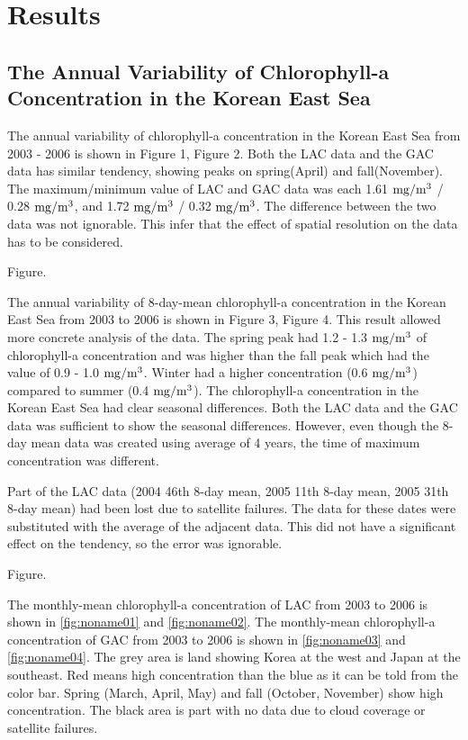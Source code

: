 
\section{Results}
 
\subsection{The Annual Variability of Chlorophyll-a Concentration in the Korean East Sea}
 
The annual variability of chlorophyll-a concentration in the Korean East Sea from 2003 - 2006 is shown in Figure 1, Figure 2. Both the LAC data and the GAC data has similar tendency, showing peaks on spring(April) and fall(November). The maximum/minimum value of LAC and GAC data was each 1.61 $\rm mg/m^3$ / 0.28 $\rm mg/m^3$, and 1.72 $\rm mg/m^3$ / 0.32 $\rm mg/m^3$. The difference between the two data was not ignorable. This infer that the effect of spatial resolution on the data has to be considered.
  
 Figure.
 
The annual variability of 8-day-mean chlorophyll-a concentration in the Korean East Sea from 2003 to 2006 is shown in Figure 3, Figure 4. This result allowed more concrete analysis of the data. The spring peak had 1.2 - 1.3 $\rm mg/m^3$ of chlorophyll-a concentration and was higher than the fall peak which had the value of 0.9 - 1.0 $\rm mg/m^3$. Winter had a higher concentration (0.6 $\rm mg/m^3$) compared to summer (0.4 $\rm mg/m^3$). The chlorophyll-a concentration in the Korean East Sea had clear seasonal differences. Both the LAC data and the GAC data was sufficient to show the seasonal differences. However, even though the 8-day mean data was created using average of 4 years, the time of maximum concentration was different. 

Part of the LAC data (2004 46th 8-day mean, 2005 11th 8-day mean, 2005 31th 8-day mean) had been lost due to satellite failures. The data for these dates were substituted with the average of the adjacent data. This did not have a significant effect on the tendency, so the error was ignorable.
  
  Figure.
 
The monthly-mean chlorophyll-a concentration of LAC from 2003 to 2006 is shown in \ref{fig:noname01} and \ref{fig:noname02}. The monthly-mean chlorophyll-a concentration of GAC from 2003 to 2006 is shown in \ref{fig:noname03} and \ref{fig:noname04}. The grey area is land showing Korea at the west and Japan at the southeast. Red means high concentration than the blue as it can be told from the color bar. Spring (March, April, May) and fall (October, November) show high concentration. The black area is part with no data due to cloud coverage or satellite failures. 
    
